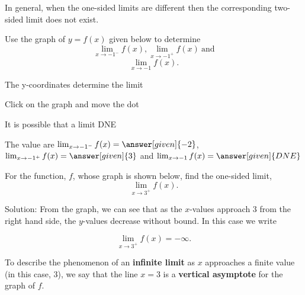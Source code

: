\documentclass{ximera}
\begin{document}
In general, when the one-sided limits are different then the 
corresponding two-sided limit does not exist.

\begin{problem} %


  Use the graph of $y = f(x)$ given below to determine
  \[
  \lim_{x\to -1^-} f(x), \lim_{x\to -1^+} f(x) \ \text{and}
	\]
	\[
	\lim_{x\to -1} f(x).
	\]
  
  
    \begin{hint}
      The y-coordinates determine the limit
    \end{hint}
		\begin{hint}
		  Click on the graph and move the dot
		\end{hint}
		\begin{hint}
		  It is possible that a limit DNE
		\end{hint}
		The value are $\lim_{x\to -1^-} f(x)=\answer[given]{-2}$, 
		$\lim_{x\to -1^+} f(x)=\answer[given]{3}$ and 
		$\lim_{x\to -1} f(x)=\answer[given]{DNE}$



	
\end{problem}


\begin{example} %
For the function, $f$, whose graph is shown below, find the one-sided limit,
\[
\lim_{x \to 3^+}f(x).
\]




\vspace{.25in}
Solution: From the graph, we can see that as the $x$-values approach 3 from the right hand side, the $y$-values decrease without bound.  In this case we write

\[
\lim_{x \to 3^+}f(x) = -\infty.
\]

To describe the phenomenon of an \textbf{infinite limit} as $x$ approaches a finite value (in this case, 3), 
we say that the line $x = 3$ is a \textbf{vertical asymptote} for the graph of $f$.

\end{example}
\end{document}
